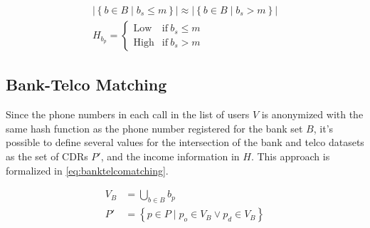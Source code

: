 \begin{equation}
\label{eq:lowhighincome}
\begin{gathered}
	\left| \left\{ b \in B \mid b_s \leq m \right\} \right| \approx \left| \left\{ b \in B \mid b_s > m \right\} \right| \\
	H_{b_p} = \begin{cases} \text{Low} & \text{if} \ b_s \leq m \\ \text{High} & \text{if} \ b_s > m \end{cases}
\end{gathered}
\end{equation}

\subsection{Bank-Telco Matching}

Since the phone numbers in each call in the list of users $V$ is anonymized with the same hash function as the phone number registered for the bank set $B$, it's possible to define several values for the intersection of the bank and telco datasets as the set of CDRs $P'$, and the income information in $H$. This approach is formalized in \cref{eq:banktelcomatching}.

\begin{equation}
\label{eq:banktelcomatching}
\begin{aligned}
	V_B &= \bigcup_{b \in B} b_p \\
	P' &= \left\{ p \in P \mid p_o \in V_B \lor p_d \in V_B \right\}
\end{aligned}
\end{equation}
